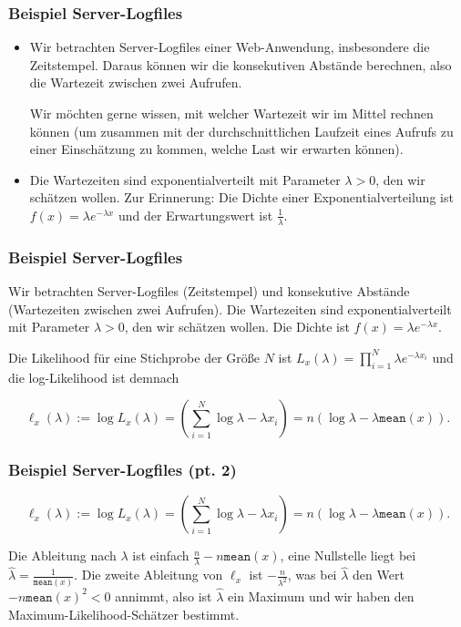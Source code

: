   
      \begin{frame}
        \frametitle{Beispiel Server-Logfiles}
        \begin{itemize}[<+->]
          \item
    Wir betrachten Server-Logfiles einer Web-Anwendung, insbesondere die Zeitstempel. Daraus können wir die konsekutiven Abstände berechnen, also die Wartezeit zwischen zwei Aufrufen.

    Wir möchten gerne wissen, mit welcher Wartezeit wir im Mittel rechnen können (um zusammen mit der durchschnittlichen Laufzeit eines Aufrufs zu einer Einschätzung zu kommen, welche Last wir erwarten können).

\item
      Die Wartezeiten sind exponentialverteilt mit Parameter $\lambda > 0$, den wir schätzen wollen. Zur Erinnerung: Die Dichte einer Exponentialverteilung ist $f(x) = \lambda e^{-\lambda x}$ und der Erwartungswert ist $\frac{1}{\lambda}$.
\end{itemize}
  \end{frame}
      
      \begin{frame}
        \frametitle{Beispiel Server-Logfiles}
    Wir betrachten Server-Logfiles (Zeitstempel) und konsekutive Abstände (Wartezeiten zwischen zwei Aufrufen). Die Wartezeiten sind exponentialverteilt mit Parameter $\lambda > 0$, den wir schätzen wollen. Die Dichte ist $f(x) = \lambda e^{-\lambda x}$.

Die Likelihood für eine Stichprobe der Größe $N$ ist $L_x(\lambda) = \prod_{i=1}^N \lambda e^{-\lambda x_i}$ und die log-Likelihood ist demnach

$$
\ell_x(\lambda) := \log L_x(\lambda) = \left( \sum_{i=1}^N \log\lambda - \lambda x_i\right) = n \left( \log\lambda - \lambda \texttt{mean}(x) \right).
$$


  \end{frame}
      
      \begin{frame}
    \frametitle{Beispiel Server-Logfiles (pt. 2)}
$$
\ell_x(\lambda) := \log L_x(\lambda) = \left( \sum_{i=1}^N \log\lambda - \lambda x_i\right) = n \left( \log\lambda - \lambda \texttt{mean}(x) \right).
$$

Die Ableitung nach $\lambda$ ist einfach $\frac{n}{\lambda} - n \texttt{mean}(x)$, eine Nullstelle liegt bei $\hat{\lambda} = \frac{1}{\texttt{mean}(x)}$. Die zweite Ableitung von $\ell_x$ ist $-\frac{n}{\lambda^2}$, was bei $\hat{\lambda}$ den Wert $-n{\texttt{mean}(x)}^2 < 0$ annimmt, also ist $\hat{\lambda}$ ein Maximum und wir haben den Maximum-Likelihood-Schätzer bestimmt.

\vspace{1cm}

  \end{frame}

